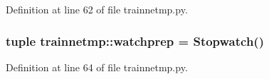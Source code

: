 Definition at line 62 of file trainnetmp.py.

\hypertarget{namespacetrainnetmp_a0207abb6efd09545a76548318d6af4cf}{
\subsubsection[{watchprep}]{\setlength{\rightskip}{0pt plus 5cm}tuple {\bf trainnetmp::watchprep} = Stopwatch()}}
\label{namespacetrainnetmp_a0207abb6efd09545a76548318d6af4cf}


Definition at line 64 of file trainnetmp.py.

